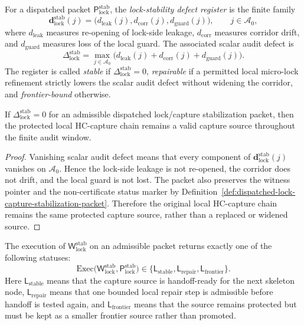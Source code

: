 \begin{definition}
\label{def:lock-stability-defect-register}
For a dispatched packet \(\mathsf P_{\mathrm{lock}}^{\mathrm{stab}}\), the \emph{lock-stability defect register} is the finite family
\[
  \mathbf d_{\mathrm{lock}}^{\mathrm{stab}}(j)
  =
  \bigl(d_{\mathrm{leak}}(j),d_{\mathrm{corr}}(j),d_{\mathrm{guard}}(j)\bigr),
  \qquad j\in \mathcal A_0,
\]
where \(d_{\mathrm{leak}}\) measures re-opening of lock-side leakage, \(d_{\mathrm{corr}}\) measures corridor drift, and \(d_{\mathrm{guard}}\) measures loss of the local guard.  The associated scalar audit defect is
\[
  \Delta_{\mathrm{lock}}^{\mathrm{stab}}
  =
  \max_{j\in\mathcal A_0}
  \bigl(d_{\mathrm{leak}}(j)+d_{\mathrm{corr}}(j)+d_{\mathrm{guard}}(j)\bigr).
\]
The register is called \emph{stable} if \(\Delta_{\mathrm{lock}}^{\mathrm{stab}}=0\), \emph{repairable} if a permitted local micro-lock refinement strictly lowers the scalar audit defect without widening the corridor, and \emph{frontier-bound} otherwise.
\end{definition}

\begin{lemma}
\label{lem:zero-lock-stability-defect-preserves-capture-source}
If \(\Delta_{\mathrm{lock}}^{\mathrm{stab}}=0\) for an admissible dispatched lock/capture stabilization packet, then the protected local HC-capture chain remains a valid capture source throughout the finite audit window.
\end{lemma}

\begin{proof}
Vanishing scalar audit defect means that every component of \(\mathbf d_{\mathrm{lock}}^{\mathrm{stab}}(j)\) vanishes on \(\mathcal A_0\). Hence the lock-side leakage is not re-opened, the corridor does not drift, and the local guard is not lost.  The packet also preserves the witness pointer and the non-certificate status marker by Definition~\ref{def:dispatched-lock-capture-stabilization-packet}.  Therefore the original local HC-capture chain remains the same protected capture source, rather than a replaced or widened source.
\end{proof}

\begin{definition}
\label{def:r16-lock-capture-stabilization-return}
The execution of \(\mathsf W_{\mathrm{lock}}^{\mathrm{stab}}\) on an admissible packet returns exactly one of the following statuses:
\[
\mathrm{Exec}\bigl(\mathsf W_{\mathrm{lock}}^{\mathrm{stab}},\mathsf P_{\mathrm{lock}}^{\mathrm{stab}}\bigr)
\in
\{\mathsf L_{\mathrm{stable}},\mathsf L_{\mathrm{repair}},\mathsf L_{\mathrm{frontier}}\}.
\]
Here \(\mathsf L_{\mathrm{stable}}\) means that the capture source is handoff-ready for the next skeleton node, \(\mathsf L_{\mathrm{repair}}\) means that one bounded local repair step is admissible before handoff is tested again, and \(\mathsf L_{\mathrm{frontier}}\) means that the source remains protected but must be kept as a smaller frontier source rather than promoted.
\end{definition}

